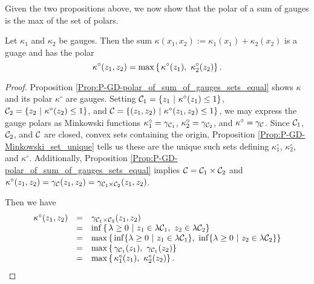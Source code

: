 \begin{enumerate}
Given the two propositions above, we now show that the polar of a sum of gauges is the max of the set of polars.

\begin{prop}			\label{Prop:P-GD-polar_of_sum_of_gauges}
Let $\kappa_1$ and $\kappa_2$ be gauges.  Then the sum $\kappa(x_1, x_2) := \kappa_1(x_1) + \kappa_2(x_2)$ is a guage and has the polar
\begin{equation}			\label{Eqn:polar_of_sum_of_gauges}
\kappa^\circ(z_1, z_2) = \max \left\{ \halfspace \kappa^\circ(z_1), \ \kappa_2^\circ(z_2) \right\}.
\end{equation}
\end{prop}
\begin{proof}
Proposition \ref{Prop:P-GD-polar_of_sum_of_gauges_sets_equal} shows $\kappa$ and its polar $\kappa^\circ$ are gauges.  Setting $\caC_1 = \{ z_1 \ | \ \kappa^\circ(z_1) \leq 1 \}$, ${\mathcal C}_2 = \{ z_2 \ | \ \kappa^\circ(z_2) \leq 1 \}$, and ${\mathcal C} = \{ (z_1, z_2) \ | \ \kappa^\circ(z_1, z_2) \leq 1 \}$, we may express the gauge polars as Minkowski functions $\kappa_1^\circ = \gamma_{{\mathcal C}_1}$, $\kappa_2^\circ = \gamma_{{\mathcal C}_2}$, and $\kappa^\circ = \gamma_{{\mathcal C}}$.  Since ${\mathcal C}_1$, ${\mathcal C}_2$, and ${\mathcal C}$ are closed, convex sets containing the origin, Proposition \ref{Prop:P-GD-Minkowski_set_unique} tells us these are the unique such sets defining $\kappa_1^\circ$, $\kappa_2^\circ$, and $\kappa^\circ$.  Additionally, Proposition \ref{Prop:P-GD-polar_of_sum_of_gauges_sets_equal} implies ${\mathcal C} = {\mathcal C}_1 \times {\mathcal C}_2$ and $\kappa^\circ(z_1, z_2) =	\gamma_{{\mathcal C}}(z_1, z_2) 	=	\gamma_{{\mathcal C}_1 \times {\mathcal C}_2}(z_1, z_2)$.


Then we have
\begin{equation}
\begin{array}{rll}
\kappa^\circ(z_1, z_2)	  & =	&	\gamma_{\caC_1 \times \caC_2}(z_1, z_2)	\\
	&	=	&	\inf \left\{ \halfspace \lambda \geq 0 \ | \ z_1 \in \lambda \caC_1, \ z_2 \in \lambda \caC_2 \right\} \\
	&	=	&	\max \left\{ \halfspace \inf \{ \lambda \geq 0 \ | \ z_1 \in \lambda \caC_1 \}, 
									\ \inf \{ \lambda \geq 0 \ | \ z_2 \in \lambda \caC_2 \} 	\right\}	\\
	&	=	&	\max \left\{ \halfspace \gamma_{\caC_1}(z_1), \ \gamma_{\caC_1}(z_2) \right\}	\\
	&	=	&	\max \left\{ \halfspace \kappa_1^\circ(z_1), \ \kappa_2^\circ(z_2) \right\}.
\end{array}
\end{equation}
\end{proof}



\end{enumerate}
